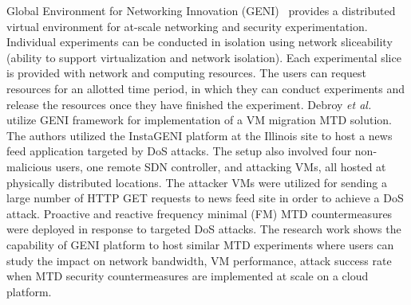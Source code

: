 {Global Environment for Networking Innovation} (GENI)~ provides a distributed virtual environment for at-scale networking and security experimentation. Individual experiments can be conducted in isolation using network sliceability (ability to support virtualization and network isolation). Each experimental slice is provided with network and computing resources. The users can request resources for an allotted time period, in which they can conduct experiments and release the resources once they have finished the experiment.
Debroy \textit{et al.}~ utilize GENI framework for implementation of a {VM migration} MTD solution. The authors utilized the {InstaGENI} platform at the Illinois site to host a news feed application targeted by DoS attacks. The setup also involved four non-malicious users, one remote SDN controller, and attacking VMs, all hosted at physically distributed locations. The attacker VMs were utilized for sending a large number of HTTP GET requests to news feed site in order to achieve a DoS attack. Proactive and reactive frequency minimal (FM) MTD countermeasures were deployed in response to targeted DoS attacks. The research work shows the capability of GENI platform to host similar MTD experiments where users can study the impact on network bandwidth, VM performance, attack success rate when MTD security countermeasures are implemented at scale on a cloud platform.  
